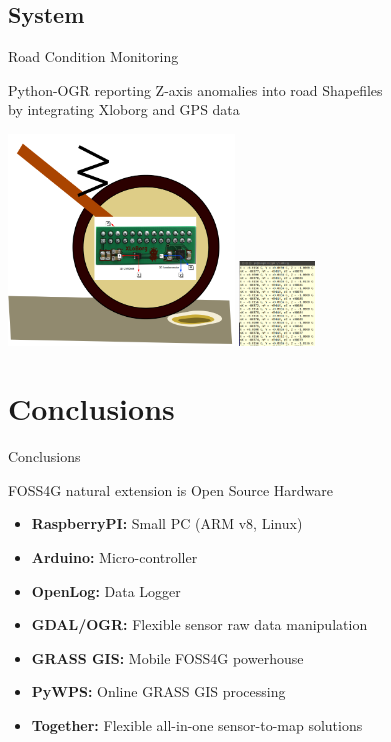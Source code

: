 \documentclass[xcolor=dvipsnames,beamer]{beamer} %
\begin{document}
\subsection{System}
\begin{frame}[fragile]{Road Condition Monitoring}

Python-OGR reporting Z-axis anomalies into road Shapefiles\\
by integrating Xloborg and GPS data

\begin{center}
 \includegraphics[width=6cm]{road_condition}
 \hspace{5mm}
 \includegraphics[width=2cm]{accelerometer_data}
\end{center}

\end{frame}

\section{Conclusions}
\begin{frame}[fragile]{Conclusions}

\begin{block}{FOSS4G natural extension is Open Source Hardware}
\begin{itemize}
 \item {\bf RaspberryPI:} Small PC (ARM v8, Linux) 
 \item {\bf Arduino:} Micro-controller
 \item {\bf OpenLog:} Data Logger
 \item {\bf GDAL/OGR:} Flexible sensor raw data manipulation
 \item {\bf GRASS GIS:} Mobile FOSS4G powerhouse
 \item {\bf PyWPS:} Online GRASS GIS processing 
 \item {\bf Together:} Flexible all-in-one sensor-to-map solutions
\end{itemize}
\end{block}
\end{frame}
\end{document}
